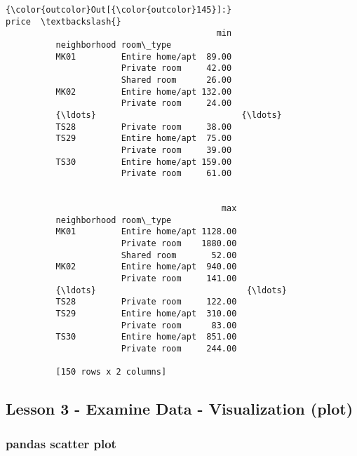 \documentclass[11pt]{article}
\begin{document}
\begin{Verbatim}[commandchars=\\\{\}]
{\color{outcolor}Out[{\color{outcolor}145}]:}                               price  \textbackslash{}
                                          min   
          neighborhood room\_type                
          MK01         Entire home/apt  89.00   
                       Private room     42.00   
                       Shared room      26.00   
          MK02         Entire home/apt 132.00   
                       Private room     24.00   
          {\ldots}                             {\ldots}   
          TS28         Private room     38.00   
          TS29         Entire home/apt  75.00   
                       Private room     39.00   
          TS30         Entire home/apt 159.00   
                       Private room     61.00   
          
                                                
                                           max  
          neighborhood room\_type                
          MK01         Entire home/apt 1128.00  
                       Private room    1880.00  
                       Shared room       52.00  
          MK02         Entire home/apt  940.00  
                       Private room     141.00  
          {\ldots}                              {\ldots}  
          TS28         Private room     122.00  
          TS29         Entire home/apt  310.00  
                       Private room      83.00  
          TS30         Entire home/apt  851.00  
                       Private room     244.00  
          
          [150 rows x 2 columns]
\end{Verbatim}
            
    \subsection{Lesson 3 - Examine Data - Visualization
(plot)}\label{lesson-3---examine-data---visualization-plot}

    \subsubsection{pandas scatter plot}\label{pandas-scatter-plot}
\end{document}
